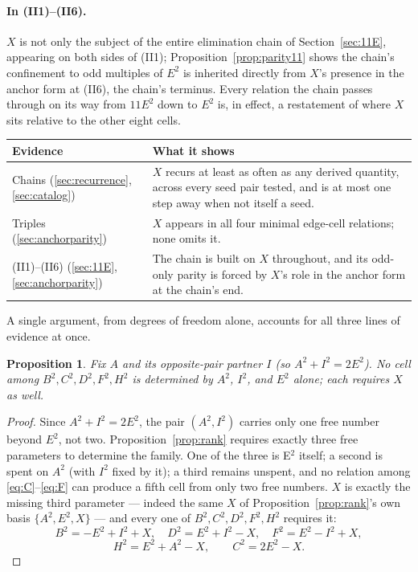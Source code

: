 \documentclass[12pt]{article}
\newtheorem{proposition}[theorem]{Proposition}
\theoremstyle{remark}
\begin{document}
\paragraph{In (II1)--(II6).} $X$ is not only the subject of the entire
elimination chain of Section~\ref{sec:11E}, appearing on both sides of
(II1); Proposition~\ref{prop:parity11} shows the chain's confinement
to odd multiples of $E^2$ is inherited directly from $X$'s presence
in the anchor form at (II6), the chain's terminus. Every relation the
chain passes through on its way from $11E^2$ down to $E^2$ is, in
effect, a restatement of where $X$ sits relative to the other eight
cells.

\begin{center}
\begin{tabular}{lp{9.5cm}}
\hline
Evidence & What it shows \\
\hline
Chains (\ref{sec:recurrence}, \ref{sec:catalog}) & $X$ recurs at least
as often as any derived quantity, across every seed pair tested, and
is at most one step away when not itself a seed. \\
Triples (\ref{sec:anchorparity}) & $X$ appears in all four minimal
edge-cell relations; none omits it. \\
(II1)--(II6) (\ref{sec:11E}, \ref{sec:anchorparity}) & The chain is
built on $X$ throughout, and its odd-only parity is forced by $X$'s
role in the anchor form at the chain's end. \\
\hline
\end{tabular}
\end{center}

A single argument, from degrees of freedom alone, accounts for all
three lines of evidence at once.

\begin{proposition}\label{prop:xindispensable}
Fix $A$ and its opposite-pair partner $I$ (so $A^2+I^2=2E^2$). No cell
among $B^2,C^2,D^2,F^2,H^2$ is determined by $A^2$, $I^2$, and $E^2$
alone; each requires $X$ as well.
\end{proposition}

\begin{proof}
Since $A^2+I^2=2E^2$, the pair $(A^2,I^2)$ carries only one free
number beyond $E^2$, not two. Proposition~\ref{prop:rank} requires
exactly three free parameters to determine the family. One of the
three is E$^2$ itself; a second is spent on $A^2$ (with $I^2$ fixed by
it); a third remains unspent, and no relation among
\eqref{eq:C}--\eqref{eq:F} can produce a fifth cell from only two free
numbers. $X$ is exactly the missing third parameter --- indeed the
same $X$ of Proposition~\ref{prop:rank}'s own basis $\{A^2,E^2,X\}$ ---
and every one of $B^2,C^2,D^2,F^2,H^2$ requires it:
\[
B^2=-E^2+I^2+X, \quad D^2=E^2+I^2-X, \quad F^2=E^2-I^2+X,
\]
\[
H^2=E^2+A^2-X, \qquad C^2=2E^2-X .
\]
\end{proof}
\end{document}
